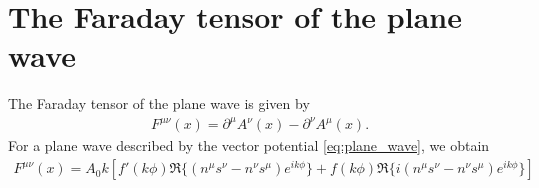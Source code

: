 \section{The Faraday tensor of the plane wave}

The Faraday tensor of the plane wave is given by
\begin{align}
    F^{\mu\nu}(x) = \partial^\mu A^\nu(x) - \partial^\nu A^\mu(x).
\end{align}
For a plane wave described by the vector potential \eqref{eq:plane_wave}, we obtain
\begin{align}
    F^{\mu\nu}(x) = A_0 k \left[f'(k \phi)\Re\{(n^\mu s^\nu - n^\nu s^\mu) e^{ik \phi}\} +  f(k\phi)\Re\{i(n^\mu s^\nu - n^\nu s^\mu) e^{ik\phi}\}\right]
\end{align}

